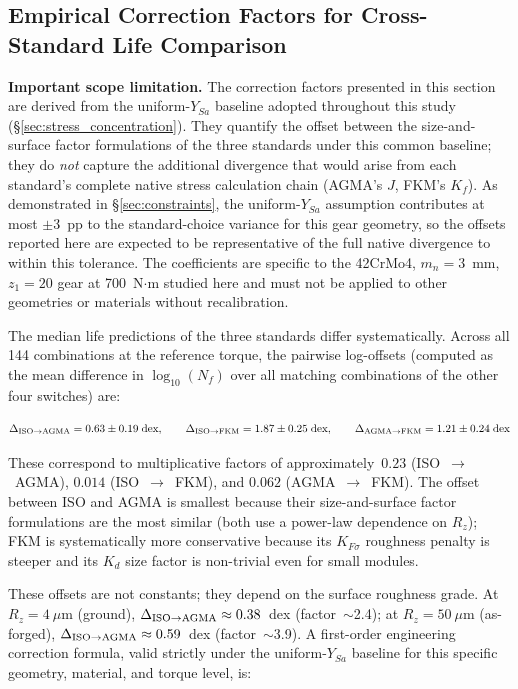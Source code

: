 \documentclass[12pt,a4paper]{article}
\begin{document}
\subsection{Empirical Correction Factors for Cross-Standard Life Comparison}

\textbf{Important scope limitation.} The correction factors presented
in this section are derived from the uniform-$Y_{Sa}$ baseline
adopted throughout this study (\S\ref{sec:stress_concentration}). They
quantify the offset between the size-and-surface factor formulations
of the three standards under this common baseline; they do \emph{not}
capture the additional divergence that would arise from each
standard's complete native stress calculation chain (AGMA's $J$,
FKM's $K_f$). As demonstrated in \S\ref{sec:constraints}, the
uniform-$Y_{Sa}$ assumption contributes at most $\pm$3~pp to the
standard-choice variance for this gear geometry, so the offsets
reported here are expected to be representative of the full native
divergence to within this tolerance. The coefficients are specific
to the 42CrMo4, $m_n=3$~mm, $z_1=20$ gear at 700~N$\cdot$m
studied here and must not be applied to other geometries or materials
without recalibration.

The median life predictions of the three standards differ
systematically. Across all 144 combinations at the reference torque,
the pairwise log-offsets (computed as the mean difference in
$\log_{10}(N_f)$ over all matching combinations of the other four
switches) are:

\begin{equation}
\Delta_{\rm ISO\to AGMA} = 0.63 \pm 0.19\;\text{dex},\qquad
\Delta_{\rm ISO\to FKM}  = 1.87 \pm 0.25\;\text{dex},\qquad
\Delta_{\rm AGMA\to FKM} = 1.21 \pm 0.24\;\text{dex}
\label{eq:offsets}
\end{equation}

These correspond to multiplicative factors of approximately~$0.23$
(ISO~$\to$~AGMA), $0.014$ (ISO~$\to$~FKM), and $0.062$
(AGMA~$\to$~FKM). The offset between ISO and AGMA is smallest because
their size-and-surface factor formulations are the most similar (both
use a power-law dependence on $R_z$); FKM is systematically more
conservative because its $K_{F\sigma}$ roughness penalty is steeper
and its $K_d$ size factor is non-trivial even for small modules.

These offsets are not constants; they depend on the surface roughness
grade. At $R_z=4~\mu$m (ground), $\Delta_{\rm ISO\to AGMA} \approx
0.38$~dex (factor~$\sim$2.4); at $R_z=50~\mu$m (as-forged),
$\Delta_{\rm ISO\to AGMA} \approx 0.59$~dex (factor~$\sim$3.9). A
first-order engineering correction formula, valid strictly under the uniform-$Y_{Sa}$ baseline for this specific
geometry, material, and torque level, is:
\end{document}
